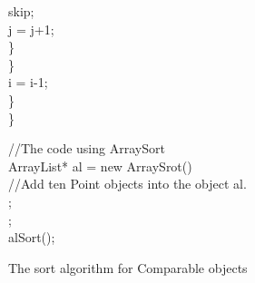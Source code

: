 \documentclass[fleqn]{llncs}
\begin{document}
\begin{figure}
\begin{boxedminipage}{0.9\textwidth}
{\begin{tabbing}
\>     \>  \>    \>  \>  \>skip;\\
\>     \>  \>    \>  \>j = j+1;\\
\>     \>  \>    \>\}\\
\>     \>  \>\}\\
\>     \>  \>i = i-1;\\
\>     \>  \}\\
\}\\
\end{tabbing}
}
{\small //The code using ArraySort}\\
\scriptsize
ArrayList* al = new ArraySrot()\\
//Add ten Point objects into the object al.\\
;\\
;\\
al{\fldacc}Sort();\\
\end{boxedminipage}
\caption{The sort algorithm for Comparable objects}\label{COMPARABLE-SORT}
\end{figure}
\end{document}
